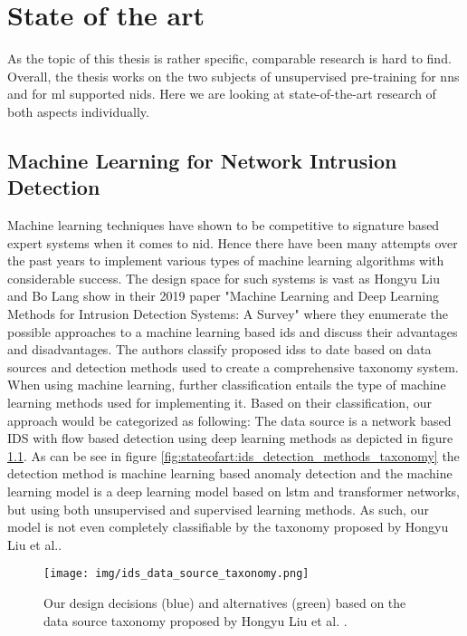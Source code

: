 \chapter{State of the art} \label{sec:stateofart}

As the topic of this thesis is rather specific, comparable research is hard to find. Overall, the thesis works on the two subjects of unsupervised pre-training for \glspl{nn} and for \gls{ml} supported \gls{nids}. Here we are looking at state-of-the-art research of both aspects individually.

\section{Machine Learning for Network Intrusion Detection}

Machine learning techniques have shown to be competitive to signature based expert systems when it comes to \gls{nid}. Hence there have been many attempts over the past years to implement various types of machine learning algorithms with considerable success. The design space for such systems is vast as Hongyu Liu and Bo Lang show in their 2019 paper \cite{nid_ml_survey_2019} "Machine Learning and Deep Learning Methods for Intrusion Detection Systems: A Survey" where they enumerate the possible approaches to a machine learning based \gls{ids} and discuss their advantages and disadvantages. The authors classify proposed \glspl{ids} to date based on data sources and detection methods used to create a comprehensive taxonomy system. When using machine learning, further classification entails the type of machine learning methods used for implementing it. Based on their classification, our approach would be categorized as following: The data source is a network based IDS with flow based detection using deep learning methods as depicted in figure \ref{fig:stateofart:ids_data_source_taxonomy}. As can be see in figure \ref{fig:stateofart:ids_detection_methods_taxonomy} the detection method is machine learning based anomaly detection and the machine learning model is a deep learning model based on \gls{lstm} and transformer networks, but using both unsupervised and supervised learning methods. As such, our model is not even completely classifiable by the taxonomy proposed by Hongyu Liu et al.. \par

\begin{figure}[H]
	\centering
	\texttt{[image: img/ids\_data\_source\_taxonomy.png]}
	\caption{Our design decisions (blue) and alternatives (green) based on the data source taxonomy proposed by Hongyu Liu et al. \cite{nid_ml_survey_2019}.}
	\label{fig:stateofart:ids_data_source_taxonomy}
\end{figure}


